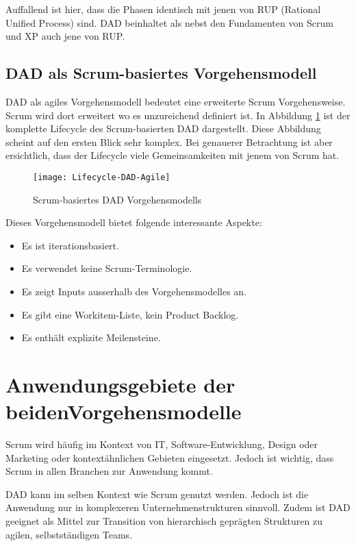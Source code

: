 Auffallend ist hier, dass die Phasen identisch mit jenen von RUP (Rational Unified Process) sind\cite{rup}. DAD beinhaltet als nebst den Fundamenten von Scrum und XP auch jene von RUP.


\subsection{DAD als Scrum-basiertes Vorgehensmodell}

DAD als agiles Vorgehensmodell bedeutet eine erweiterte Scrum Vorgehensweise. Scrum wird dort erweitert wo es unzureichend definiert ist. In Abbildung \ref{fig:lifecycle} ist der komplette Lifecycle des Scrum-basierten DAD dargestellt. Diese Abbildung scheint auf den ersten Blick sehr komplex. Bei genauerer Betrachtung ist aber ersichtlich, dass der Lifecycle viele Gemeinsamkeiten mit jenem von Scrum hat.


\begin{figure}[H]
	\centering
	\texttt{[image: Lifecycle-DAD-Agile]}
	\caption{Scrum-basiertes DAD Vorgehensmodells \cite{lifecycleDAD}}
	\label{fig:lifecycle}
\end{figure}\medskip

Dieses Vorgehensmodell bietet folgende interessante Aspekte:
\begin{itemize}
	\item Es ist iterationsbasiert.
	\item Es verwendet keine Scrum-Terminologie.
	\item Es zeigt Inputs ausserhalb des Vorgehensmodelles an.
	\item Es gibt eine Workitem-Liste, kein Product Backlog.
	\item Es enthält explizite Meilensteine.
\end{itemize}

\section{Anwendungsgebiete der beiden\newline Vorgehensmodelle}

Scrum wird häufig im Kontext von IT, Software-Entwicklung, Design oder Marketing oder kontextähnlichen Gebieten eingesetzt. Jedoch ist wichtig, dass Scrum in allen Branchen zur Anwendung kommt.

DAD kann im selben Kontext wie Scrum genutzt werden. Jedoch ist die Anwendung nur in komplexeren Unternehmenstrukturen sinnvoll. Zudem ist DAD geeignet als Mittel zur Transition von hierarchisch geprägten Strukturen zu agilen, selbstständigen Teams.
 
